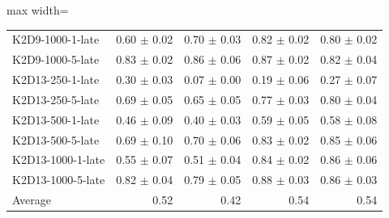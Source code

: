 \documentclass{article}
\begin{document}
\begin{table}[ht]
\begin{center}
\begin{small}
\begin{adjustbox}{max width=\columnwidth}
\begin{tabular}{l|rrrr}
K2D9-1000-1-late & 0.60 $\pm$ 0.02 & 0.70 $\pm$ 0.03 & 0.82 $\pm$ 0.02 & 0.80 $\pm$ 0.02\\
K2D9-1000-5-late & 0.83 $\pm$ 0.02 & 0.86 $\pm$ 0.06 & 0.87 $\pm$ 0.02 & 0.82 $\pm$ 0.04\\
K2D13-250-1-late & 0.30 $\pm$ 0.03 & 0.07 $\pm$ 0.00 & 0.19 $\pm$ 0.06 & 0.27 $\pm$ 0.07\\
K2D13-250-5-late & 0.69 $\pm$ 0.05 & 0.65 $\pm$ 0.05 & 0.77 $\pm$ 0.03 & 0.80 $\pm$ 0.04\\
K2D13-500-1-late & 0.46 $\pm$ 0.09 & 0.40 $\pm$ 0.03 & 0.59 $\pm$ 0.05 & 0.58 $\pm$ 0.08\\
K2D13-500-5-late & 0.69 $\pm$ 0.10 & 0.70 $\pm$ 0.06 & 0.83 $\pm$ 0.02 & 0.85 $\pm$ 0.06\\
K2D13-1000-1-late & 0.55 $\pm$ 0.07 & 0.51 $\pm$ 0.04 & 0.84 $\pm$ 0.02 & 0.86 $\pm$ 0.06\\
K2D13-1000-5-late & 0.82 $\pm$ 0.04 & 0.79 $\pm$ 0.05 & 0.88 $\pm$ 0.03 & 0.86 $\pm$ 0.03\\
\midrule
Average & 0.52 & 0.42 & 0.54 & 0.54\\
\end{tabular}
        \end{adjustbox}
    \end{small}
    \end{center}
    \vskip -0.1in
\end{table}
\end{document}
